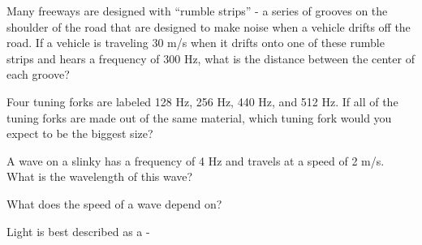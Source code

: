 \documentclass[10pt]{examdesign}
\begin{document}
\begin{multiplechoice} [title={Multiple Choice},
	rearrange=no]
\begin{question}
	Many freeways are designed with “rumble strips” - a series of grooves on the shoulder of the road that are designed to make noise when a vehicle drifts off the road.  If a vehicle is traveling 30 m/s when it drifts onto one of these rumble strips and hears a frequency of 300 Hz, what is the distance between the center of each groove?
\end{question}

\begin{question}
		Four tuning forks are labeled 128 Hz, 256 Hz, 440 Hz, and 512 Hz.  If all of the tuning forks are made out of the same material, which tuning fork would you expect to be the biggest size?
\end{question}

\begin{question}
A wave on a slinky has a frequency of 4 Hz and travels at a speed of 2 m/s.  What is the wavelength of this wave?
\end{question}

\begin{question}
What does the speed of a wave depend on?
\end{question}


\begin{question}
Light is best described as a - 
	\end{question}



\end{multiplechoice}
\end{document}
